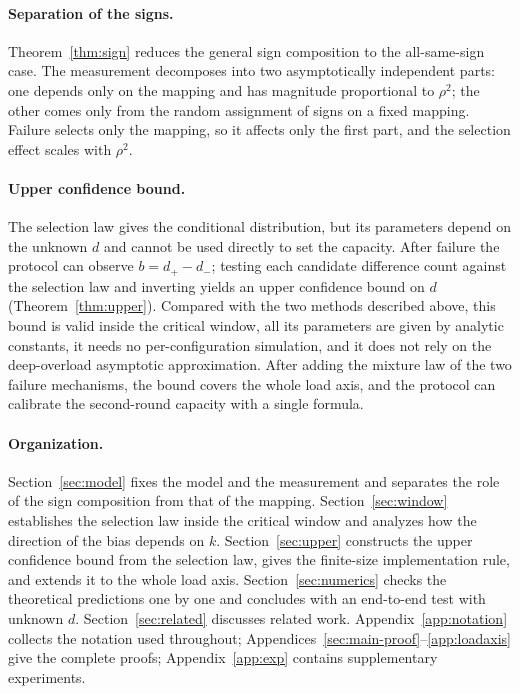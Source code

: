 \paragraph{Separation of the signs.}
Theorem~\ref{thm:sign} reduces the general sign composition to the all-same-sign case. The measurement decomposes into two asymptotically independent parts: one depends only on the mapping and has magnitude proportional to $\rho^2$; the other comes only from the random assignment of signs on a fixed mapping. Failure selects only the mapping, so it affects only the first part, and the selection effect scales with $\rho^2$.

\paragraph{Upper confidence bound.}
The selection law gives the conditional distribution, but its parameters depend on the unknown $d$ and cannot be used directly to set the capacity. After failure the protocol can observe $b=d_+-d_-$; testing each candidate difference count against the selection law and inverting yields an upper confidence bound on $d$ (Theorem~\ref{thm:upper}). Compared with the two methods described above, this bound is valid inside the critical window, all its parameters are given by analytic constants, it needs no per-configuration simulation, and it does not rely on the deep-overload asymptotic approximation. After adding the mixture law of the two failure mechanisms, the bound covers the whole load axis, and the protocol can calibrate the second-round capacity with a single formula.

\paragraph{Organization.}
Section~\ref{sec:model} fixes the model and the measurement and separates the role of the sign composition from that of the mapping.
Section~\ref{sec:window} establishes the selection law inside the critical window and analyzes how the direction of the bias depends on $k$.
Section~\ref{sec:upper} constructs the upper confidence bound from the selection law, gives the
finite-size implementation rule, and extends it to the whole load axis. Section~\ref{sec:numerics} checks the theoretical predictions one by one and concludes with an end-to-end
test with unknown $d$. Section~\ref{sec:related} discusses related work. Appendix~\ref{app:notation} collects the notation used throughout; Appendices~\ref{sec:main-proof}--\ref{app:loadaxis} give the complete proofs; Appendix~\ref{app:exp} contains supplementary experiments.
